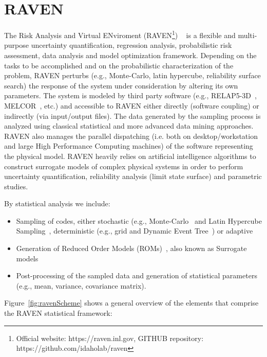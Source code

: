 \section{RAVEN}
\label{sec:raven}
 
The Risk Analysis and Virtual ENviroment 
(RAVEN\footnote{Official website: https://raven.inl.gov, GITHUB repository: https://github.com/idaholab/raven})
~\cite{RAVEN_PSAM_2014,alfonsiEsrel2014} 
is a flexible and multi-purpose uncertainty quantification, regression analysis, probabilistic
risk assessment, data analysis and model optimization framework. Depending on the tasks to be 
accomplished and on the probabilistic characterization of the problem, RAVEN perturbs 
(e.g., Monte-Carlo, latin hypercube, reliability surface search) the response of the system 
under consideration by altering its own parameters. The system is modeled by third party software 
(e.g., RELAP5-3D~\cite{relap5}, MELCOR~\cite{Melcor}, etc.) and accessible to RAVEN either directly (software coupling) 
or indirectly (via input/output files). The data generated by the sampling process is analyzed using 
classical statistical and more advanced data mining approaches. RAVEN also manages the parallel dispatching 
(i.e. both on desktop/workstation and large High Performance Computing machines) of the software 
representing the physical model. RAVEN heavily relies on artificial intelligence algorithms to construct 
surrogate models of complex physical systems in order to perform uncertainty quantification, reliability 
analysis (limit state surface) and parametric studies.

By statistical analysis we include:
\begin{itemize}
  \item Sampling of codes, either stochastic (e.g., Monte-Carlo~\cite{DynamicReliabilityMonteCarlo} 
        and Latin Hypercube Sampling~\cite{LHShelton}, deterministic (e.g., grid and
        Dynamic Event Tree~\cite{AMENDOLAdylam,cojazziDylam}) or adaptive~\cite{ANS_S_2014_raven_LS}
  \item Generation of Reduced Order Models (ROMs)~\cite{ROM_Khalik}, also known as Surrogate models
  \item Post-processing of the sampled data and generation of statistical parameters (e.g., mean, 
        variance, covariance matrix).
\end{itemize}

Figure~\ref{fig:ravenScheme} shows a general overview of the elements that comprise the RAVEN statistical framework:

